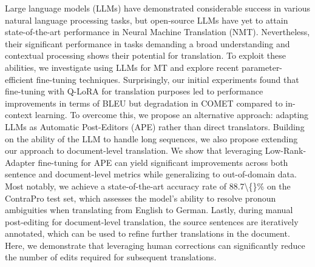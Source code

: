 Large language models (LLMs) have demonstrated considerable success in various natural language processing tasks, but open-source LLMs have yet to attain state-of-the-art performance in Neural Machine Translation (NMT). Nevertheless, their significant performance in tasks demanding a broad understanding and contextual processing shows their potential for translation. To exploit these abilities, we investigate using LLMs for MT and explore recent parameter-efficient fine-tuning techniques. Surprisingly, our initial experiments found that fine-tuning with Q-LoRA for translation purposes led to performance improvements in terms of BLEU but degradation in COMET compared to in-context learning. To overcome this, we propose an alternative approach: adapting LLMs as Automatic Post-Editors (APE) rather than direct translators. Building on the ability of the LLM to handle long sequences, we also propose extending our approach to document-level translation. We show that leveraging Low-Rank-Adapter fine-tuning for APE can yield significant improvements across both sentence and document-level metrics while generalizing to out-of-domain data. Most notably, we achieve a state-of-the-art accuracy rate of 88.7\textbackslash\{\}\% on the ContraPro test set, which assesses the model's ability to resolve pronoun ambiguities when translating from English to German. Lastly, during manual post-editing for document-level translation, the source sentences are iteratively annotated, which can be used to refine further translations in the document. Here, we demonstrate that leveraging human corrections can significantly reduce the number of edits required for subsequent translations.